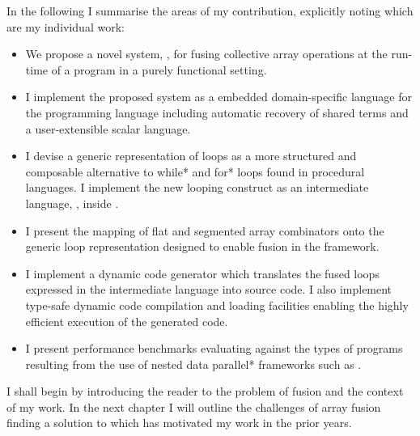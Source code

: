 \documentclass[preamble.tex]{subfiles}
\begin{document}
In the following I summarise the areas of my contribution, explicitly noting which are my individual work:
\begin{itemize}

  \item We propose a novel system, \LiveFusion, for fusing collective array operations at the run-time of a program in a purely functional setting.

  \item I implement the proposed system as a embedded domain-specific language for the \Haskell programming language including automatic recovery of shared terms and a user-extensible scalar language.

  \item I devise a generic representation of loops as a more structured and composable alternative to \*while* and \*for* loops found in procedural languages. I implement the new looping construct as an intermediate language, \Loop, inside \LiveFusion.

  \item I present the mapping of flat and segmented array combinators onto the generic loop representation designed to enable fusion in the  framework.

  \item I implement a dynamic code generator which translates the fused loops expressed in the intermediate \Loop language into \Haskell source code. I also implement type-safe dynamic code compilation and loading facilities enabling the highly efficient execution of the generated code.

  \item I present performance benchmarks evaluating \LiveFusion against the types of programs resulting from the use of \*nested data parallel* frameworks such as .

\end{itemize}

I shall begin by introducing the reader to the problem of fusion and the context of my work. In the next chapter I will outline the challenges of array fusion finding a solution to which has motivated my work in the prior years.




\IfNotCompilingAll{}
\end{document}
